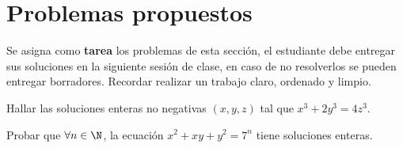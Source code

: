 \section{Problemas propuestos}

Se asigna como \textbf{tarea} los problemas de esta sección, el estudiante debe entregar sus soluciones en la siguiente
sesión de clase, en caso de no resolverlos se pueden entregar borradores.
Recordar realizar un trabajo claro, ordenado y limpio.

\begin{exercise}
    Hallar las soluciones enteras no negativas $(x,y,z)$ tal que $x^3 + 2y^3 = 4z^3$.
\end{exercise}

\begin{problem}
    Probar que $\forall n \in \N$, la ecuación $x^2 + xy + y^2 = 7^n$ tiene soluciones enteras.
\end{problem}